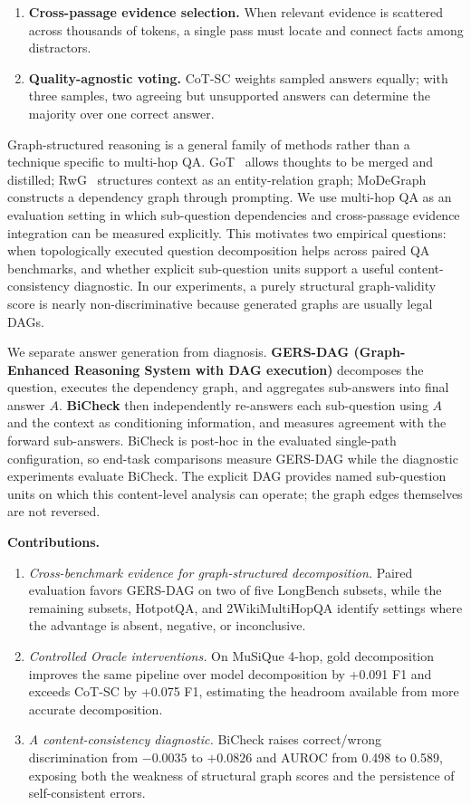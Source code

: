 \documentclass[letterpaper]{article} %
\begin{document}
\begin{enumerate}[leftmargin=*,topsep=0pt,itemsep=1pt]
\item \textbf{Cross-passage evidence selection.} When relevant evidence is scattered across thousands of tokens, a single pass must locate and connect facts among distractors.
\item \textbf{Quality-agnostic voting.} CoT-SC weights sampled answers equally; with three samples, two agreeing but unsupported answers can determine the majority over one correct answer.
\end{enumerate}

Graph-structured reasoning is a general family of methods rather than a technique specific to multi-hop QA. GoT~\citep{besta2024got} allows thoughts to be merged and distilled; RwG~\citep{han2025rwg} structures context as an entity-relation graph; MoDeGraph~\citep{oruche2025modegraph} constructs a dependency graph through prompting. We use multi-hop QA as an evaluation setting in which sub-question dependencies and cross-passage evidence integration can be measured explicitly. This motivates two empirical questions: when topologically executed question decomposition helps across paired QA benchmarks, and whether explicit sub-question units support a useful content-consistency diagnostic. In our experiments, a purely structural graph-validity score is nearly non-discriminative because generated graphs are usually legal DAGs.

We separate answer generation from diagnosis. \textbf{GERS-DAG (Graph-Enhanced Reasoning System with DAG execution)} decomposes the question, executes the dependency graph, and aggregates sub-answers into final answer $A$. \textbf{BiCheck} then independently re-answers each sub-question using $A$ and the context as conditioning information, and measures agreement with the forward sub-answers. BiCheck is post-hoc in the evaluated single-path configuration, so end-task comparisons measure GERS-DAG while the diagnostic experiments evaluate BiCheck. The explicit DAG provides named sub-question units on which this content-level analysis can operate; the graph edges themselves are not reversed.

\noindent\textbf{Contributions.}
\begin{enumerate}[leftmargin=*,topsep=0pt,itemsep=1pt]
\item \emph{Cross-benchmark evidence for graph-structured decomposition.} Paired evaluation favors GERS-DAG on two of five LongBench subsets, while the remaining subsets, HotpotQA, and 2WikiMultiHopQA identify settings where the advantage is absent, negative, or inconclusive.
\item \emph{Controlled Oracle interventions.} On MuSiQue 4-hop, gold decomposition improves the same pipeline over model decomposition by +0.091 F1 and exceeds CoT-SC by +0.075 F1, estimating the headroom available from more accurate decomposition.
\item \emph{A content-consistency diagnostic.} BiCheck raises correct/wrong discrimination from $-0.0035$ to $+0.0826$ and AUROC from 0.498 to 0.589, exposing both the weakness of structural graph scores and the persistence of self-consistent errors.
\end{enumerate}
\end{document}
